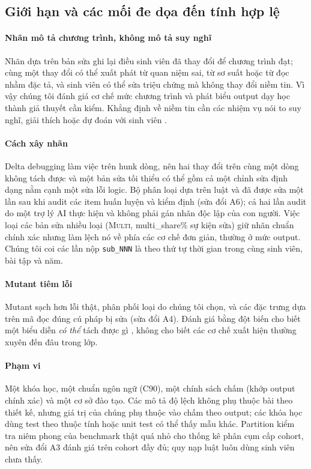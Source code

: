 \subsection{Giới hạn và các mối đe dọa đến tính hợp lệ}\label{sec:limits}

\paragraph{Nhãn mô tả chương trình, không mô tả suy nghĩ} Nhãn dựa trên bản sửa ghi lại điều sinh viên đã thay đổi để chương trình đạt; cùng một thay đổi có thể xuất phát từ quan niệm sai, từ sơ suất hoặc từ đọc nhầm đặc tả, và sinh viên có thể sửa triệu chứng mà không thay đổi niềm tin. Vì vậy chúng tôi đánh giá cơ chế mức chương trình và phát biểu output dạy học thành giả thuyết cần kiểm. Khẳng định về niềm tin cần các nhiệm vụ nói to suy nghĩ, giải thích hoặc dự đoán với sinh viên \citep{lu2024smol}.

\paragraph{Cách xây nhãn} Delta debugging làm việc trên hunk dòng, nên hai thay đổi trên cùng một dòng không tách được và một bản sửa tối thiểu có thể gồm cả một chỉnh sửa định dạng nằm cạnh một sửa lỗi logic. Bộ phân loại dựa trên luật và đã được sửa một lần sau khi audit các item huấn luyện và kiểm định (sửa đổi A6); cả hai lần audit do một trợ lý AI thực hiện và không phải gán nhãn độc lập của con người. Việc loại các bản sửa nhiều loại (\textsc{Multi}, {{multi_share}}\% sự kiện sửa) giữ nhãn chuẩn chính xác nhưng làm lệch nó về phía các cơ chế đơn giản, thường ở mức output. Chúng tôi coi các lần nộp \texttt{sub\_NNN} là theo thứ tự thời gian trong cùng sinh viên, bài tập và năm.

\paragraph{Mutant tiêm lỗi} Mutant sạch hơn lỗi thật, phân phối loại do chúng tôi chọn, và các đặc trưng dựa trên mã đọc đúng cú pháp bị sửa (sửa đổi A4). Đánh giá bằng đột biến cho biết một biểu diễn \emph{có thể} tách được gì \citep{just2014mutants}, không cho biết các cơ chế xuất hiện thường xuyên đến đâu trong lớp.

\paragraph{Phạm vi} Một khóa học, một chuẩn ngôn ngữ (C90), một chính sách chấm (khớp output chính xác) và một cơ sở đào tạo. Các mô tả độ lệch không phụ thuộc bài theo thiết kế, nhưng giá trị của chúng phụ thuộc vào chấm theo output; các khóa học dùng test theo thuộc tính hoặc unit test có thể thấy mẫu khác. Partition kiểm tra niêm phong của benchmark thật quá nhỏ cho thống kê phân cụm cấp cohort, nên sửa đổi A3 đánh giá trên cohort đầy đủ; quy nạp luật luôn dùng sinh viên chưa thấy.

